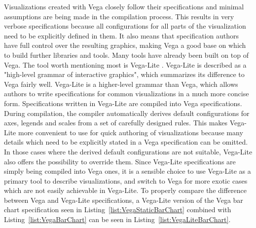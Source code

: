 Visualizations created with Vega closely follow their specifications and minimal assumptions are being made in the compilation process.
This results in very verbose specifications because all configurations for all parts of the visualization need to be explicitly defined in them.
It also means that specification authors have full control over the resulting graphics, making Vega a good base on which to build further libraries and tools.
Many tools \parencite{Voyager,Lyra,CompassQL} have already been built on top of Vega.
The tool worth mentioning most is Vega-Lite \parencite{VegaLite}.
Vega-Lite is described as a "high-level grammar of interactive graphics", which summarizes its difference to Vega fairly well.
Vega-Lite is a higher-level grammar than Vega, which allows authors to write specifications for common visualizations in a much more concise form.
Specifications written in Vega-Lite are compiled into Vega specifications.
During compilation, the compiler automatically derives default configurations for axes, legends and scales from a set of carefully designed rules.
This makes Vega-Lite more convenient to use for quick authoring of visualizations because many details which need to be explicitly stated in a Vega specification can be omitted.
In those cases where the derived default configurations are not suitable, Vega-Lite also offers the possibility to override them.
Since Vega-Lite specifications are simply being compiled into Vega ones, it is a sensible choice to use Vega-Lite as a primary tool to describe visualizations, and switch to Vega for more exotic cases which are not easily achievable in Vega-Lite.
To properly compare the difference between Vega and Vega-Lite specifications, a Vega-Lite version of the Vega bar chart specification seen in Listing~\ref{list:VegaStaticBarChart} combined with Listing~\ref{list:VegaBarChart} can be seen in Listing~\ref{list:VegaLiteBarChart}.

\begin{samepage}
 
    This is a Vega-Lite specification of the Vega bar chart specification seen in Listing~\ref{list:VegaStaticBarChart} combined with Listing~\ref{list:VegaBarChart}.
  },
]{listings/vega-lite-bar-chart.json}
\end{samepage}


